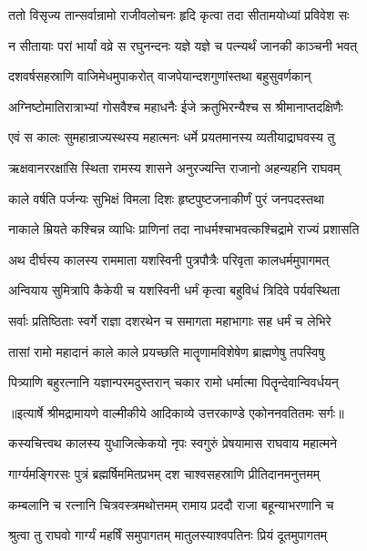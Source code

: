 \twolineshloka
{ततो विसृज्य तान्सर्वान्रामो राजीवलोचनः}
{हृदि कृत्वा तदा सीतामयोध्यां प्रविवेश सः} %

\twolineshloka
{न सीतायाः परां भार्यां वव्रे स रघुनन्दनः}
{यज्ञे यज्ञे च पत्न्यर्थं जानकी काञ्चनी भवत्} %

\twolineshloka
{दशवर्षसहस्राणि वाजिमेधमुपाकरोत्}
{वाजपेयान्दशगुणांस्तथा बहुसुवर्णकान्} %

\twolineshloka
{अग्निष्टोमातिरात्राभ्यां गोसवैश्च महाधनैः}
{ईजे क्रतुभिरन्यैश्च स श्रीमानाप्तदक्षिणैः} %

\twolineshloka
{एवं स कालः सुमहान्राज्यस्थस्य महात्मनः}
{धर्मे प्रयतमानस्य व्यतीयाद्राघवस्य तु} %

\twolineshloka
{ऋक्षवानररक्षांसि स्थिता रामस्य शासने}
{अनुरज्यन्ति राजानो अहन्यहनि राघवम्} %

\twolineshloka
{काले वर्षति पर्जन्यः सुभिक्षं विमला दिशः}
{हृष्टपुष्टजनाकीर्णं पुरं जनपदस्तथा} %

\twolineshloka
{नाकाले म्रियते कश्चिन्न व्याधिः प्राणिनां तदा}
{नाधर्मश्चाभवत्कश्चिद्रामे राज्यं प्रशासति} %

\twolineshloka
{अथ दीर्घस्य कालस्य राममाता यशस्विनी}
{पुत्रपौत्रैः परिवृता कालधर्ममुपागमत्} %

\twolineshloka
{अन्वियाय सुमित्रापि कैकेयी च यशस्विनी}
{धर्मं कृत्वा बहुविधं त्रिदिवे पर्यवस्थिता} %

\twolineshloka
{सर्वाः प्रतिष्ठिताः स्वर्गे राज्ञा दशरथेन च}
{समागता महाभागाः सह धर्मं च लेभिरे} %

\twolineshloka
{तासां रामो महादानं काले काले प्रयच्छति}
{मातॄणामविशेषेण ब्राह्मणेषु तपस्विषु} %

\twolineshloka
{पित्र्याणि बहुरत्नानि यज्ञान्परमदुस्तरान्}
{चकार रामो धर्मात्मा पितॄन्देवान्विवर्धयन्} %


{॥इत्यार्षे श्रीमद्रामायणे वाल्मीकीये आदिकाव्ये उत्तरकाण्डे एकोननवतितमः सर्गः॥}


\twolineshloka
{कस्यचित्त्वथ कालस्य युधाजित्केकयो नृपः}
{स्वगुरुं प्रेषयामास राघवाय महात्मने} %

\twolineshloka
{गार्ग्यमङ्गिरसः पुत्रं ब्रह्मर्षिममितप्रभम्}
{दश चाश्वसहस्राणि प्रीतिदानमनुत्तमम्} %

\twolineshloka
{कम्बलानि च रत्नानि चित्रवस्त्रमथोत्तमम्}
{रामाय प्रददौ राजा बहून्याभरणानि च} %

\twolineshloka
{श्रुत्वा तु राघवो गार्ग्यं महर्षिं समुपागतम्}
{मातुलस्याश्वपतिनः प्रियं दूतमुपागतम्} %

